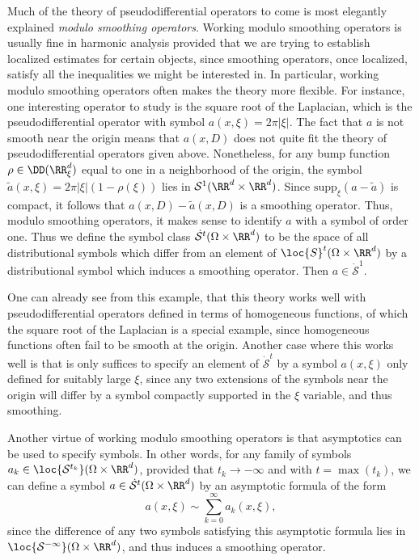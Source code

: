 Much of the theory of pseudodifferential operators to come is most elegantly explained \emph{modulo smoothing operators}. Working modulo smoothing operators is usually fine in harmonic analysis provided that we are trying to establish localized estimates for certain objects, since smoothing operators, once localized, satisfy all the inequalities we might be interested in. In particular, working modulo smoothing operators often makes the theory more flexible. For instance, one interesting operator to study is the square root of the Laplacian, which is the pseudodifferential operator with symbol $a(x,\xi) = 2 \pi |\xi|$. The fact that $a$ is not smooth near the origin means that $a(x,D)$ does not quite fit the theory of pseudodifferential operators given above. Nonetheless, for any bump function $\rho \in \DD(\RR^d_\xi)$ equal to one in a neighborhood of the origin, the symbol $\tilde{a}(x,\xi) = 2 \pi |\xi| (1 - \rho(\xi))$ lies in $\mathcal{S}^1(\RR^d \times \RR^d)$. Since $\text{supp}_\xi(a - \tilde{a})$ is compact, it follows that $a(x,D) - \tilde{a}(x,D)$ is a smoothing operator. Thus, modulo smoothing operators, it makes sense to identify $a$ with a symbol of order one. Thus we define the symbol class $\dot{\mathcal{S}}^t(\Omega \times \RR^d)$ to be the space of all distributional symbols which differ from an element of $\loc{S}^t(\Omega \times \RR^d)$ by a distributional symbol which induces a smoothing operator. Then $a \in \dot{\mathcal{S}}^1$.

One can already see from this example, that this theory works well with pseudodifferential operators defined in terms of homogeneous functions, of which the square root of the Laplacian is a special example, since homogeneous functions often fail to be smooth at the origin. Another case where this works well is that is only suffices to specify an element of $\dot{\mathcal{S}}^t$ by a symbol $a(x,\xi)$ only defined for suitably large $\xi$, since any two extensions of the symbols near the origin will differ by a symbol compactly supported in the $\xi$ variable, and thus smoothing.

Another virtue of working modulo smoothing operators is that asymptotics can be used to specify symbols. In other words, for any family of symbols $a_k \in \loc{\mathcal{S}^{t_k}}(\Omega \times \RR^d)$, provided that $t_k \to -\infty$ and with $t = \max(t_k)$, we can define a symbol $a \in \dot{\mathcal{S}}^t(\Omega \times \RR^d)$ by an asymptotic formula of the form
%
\[ a(x,\xi) \sim \sum_{k = 0}^\infty a_k(x,\xi), \]
%
since the difference of any two symbols satisfying this asymptotic formula lies in $\loc{\mathcal{S}^{-\infty}}(\Omega \times \RR^d)$, and thus induces a smoothing operator.

